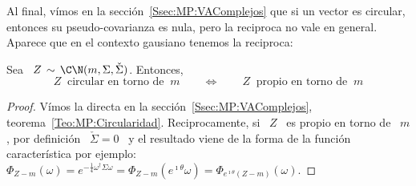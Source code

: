 Al final, v\'imos en la  secci\'on~\ref{Ssec:MP:VAComplejos} que si un vector es
circular, entonces  su pseudo-covarianza es nula,  pero la reciproca  no vale en
general. Aparece que en el contexto gausiano tenemos la reciproca:
%

\begin{teorema}[Circularidad]\label{Teo:MP:CircularidadGaussiana}
%
Sea \ $Z \, \sim \, \C\N(m,\Sigma,\check{\Sigma})$.  Entonces,
  \[
  Z \: \mbox{ circular  en torno de } \: m \qquad  \Longleftrightarrow \qquad Z \:
\mbox{ propio en torno de } \: m
  \]
\end{teorema}
%
\begin{proof}
  V\'imos     la    directa    en     la    secci\'on~\ref{Ssec:MP:VAComplejos},
  teorema~\ref{Teo:MP:Circularidad}.  Reciprocamente,  si \  $Z$ \ es  propio en
  torno de \ $m$, por definici\'on \ $\check{\Sigma} = 0$ \ y el resultado viene
  de la forma de  la funci\'on caracter\'istica por ejemplo: $\Phi_{Z-m}(\omega)
  = e^{-\frac14 \omega^\dag \Sigma \omega } = \Phi_{Z-m}\left( e^{\imath \theta}
    \omega \right) = \Phi_{e^{\imath \theta} (Z-m)}(\omega)$.
\end{proof}


